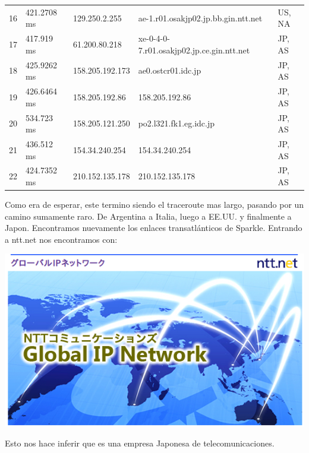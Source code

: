 \begin{table}[H]
\begin{tabular}{@{}lllll@{}}
16 & 421.2708 ms & 129.250.2.255 & ae-1.r01.osakjp02.jp.bb.gin.ntt.net & US, NA\\
17 & 417.919 ms & 61.200.80.218 & xe-0-4-0-7.r01.osakjp02.jp.ce.gin.ntt.net & JP, AS\\
18 & 425.9262 ms & 158.205.192.173 & ae0.ostcr01.idc.jp & JP, AS\\
19 & 426.6464 ms & 158.205.192.86 & 158.205.192.86 & JP, AS\\
20 & 534.723 ms & 158.205.121.250 & po2.l321.fk1.eg.idc.jp & JP, AS\\
21 & 436.512 ms & 154.34.240.254 & 154.34.240.254 & JP, AS\\
22 & 424.7352 ms & 210.152.135.178 & 210.152.135.178 & JP, AS\\
 \bottomrule
\end{tabular}
\label{tokyo}
\end{table}

\vspace{1px}

Como era de esperar, este termino siendo el traceroute mas largo, pasando por un camino sumamente raro. De Argentina a Italia, luego a EE.UU. y finalmente a Japon. Encontramos nuevamente los enlaces transatlánticos de Sparkle. Entrando a ntt.net nos encontramos con:

\includegraphics[width=\textwidth,keepaspectratio]{images/ntt}

Esto nos hace inferir que es una empresa Japonesa de telecomunicaciones.